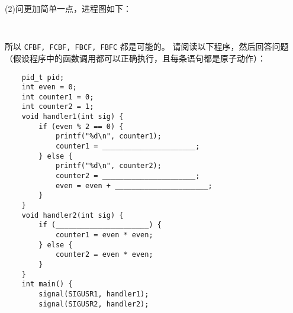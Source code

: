 \begin{problems}
        (2)问更加简单一点，进程图如下：
        \begin{figure}[H]
            \small
            \tt
            \centering
        \end{figure}
        所以 \verb|CFBF, FCBF, FBCF, FBFC| 都是可能的。
         请阅读以下程序，然后回答问题（假设程序中的函数调用都可以正确执行，且每条语句都是原子动作）：
        \begin{verbatim}
    pid_t pid;
    int even = 0;
    int counter1 = 0;
    int counter2 = 1;
    void handler1(int sig) {
        if (even % 2 == 0) {
            printf("%d\n", counter1);
            counter1 = ______________________;
        } else {
            printf("%d\n", counter2);
            counter2 = ______________________;
            even = even + ______________________;
        }
    }
    void handler2(int sig) {
        if (______________________) {
            counter1 = even * even;
        } else {
            counter2 = even * even;
        }
    }
    int main() {
        signal(SIGUSR1, handler1);
        signal(SIGUSR2, handler2);


\end{verbatim}
\end{problems}
